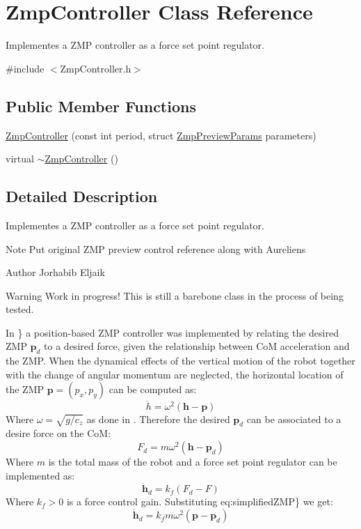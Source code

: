 \hypertarget{classZmpController}{}\section{Zmp\+Controller Class Reference}
\label{classZmpController}


Implementes a Z\+MP controller as a force set point regulator.  




{\ttfamily \#include $<$Zmp\+Controller.\+h$>$}

\subsection*{Public Member Functions}
\begin{DoxyCompactItemize}
\item 
\hyperlink{classZmpController_a99bbb6b02a6abafa3968d5c7a77e462b}{Zmp\+Controller} (const int period, struct \hyperlink{structZmpPreviewParams}{Zmp\+Preview\+Params} parameters)
\item 
virtual \hyperlink{classZmpController_af308a70e70cfe9a1e9569606da8b1739}{$\sim$\+Zmp\+Controller} ()
\end{DoxyCompactItemize}


\subsection{Detailed Description}
Implementes a Z\+MP controller as a force set point regulator. 

\begin{DoxyNote}{Note}
Put original Z\+MP preview control reference along with Aurelien\textquotesingle{}s
\end{DoxyNote}
\begin{DoxyAuthor}{Author}
Jorhabib Eljaik
\end{DoxyAuthor}
\cite{krause2012stabilization}

\begin{DoxyWarning}{Warning}
Work in progress! This is still a barebone class in the process of being tested.
\end{DoxyWarning}
In \cite{krause2012stabilization}\} a position-\/based Z\+MP controller was implemented by relating the desired Z\+MP $ \mathbf{p}_d $ to a desired force, given the relationship between CoM acceleration and the Z\+MP. When the dynamical effects of the vertical motion of the robot together with the change of angular momentum are neglected, the horizontal location of the Z\+MP $\mathbf{p} = (p_x, p_y)$ can be computed as\+: \begin{equation} \ddot{h} = \omega^2(\mathbf{h} - \mathbf{p}) \label{eq:simplifiedZMP} \end{equation} Where $\omega = \sqrt{g/c_z}$ as done in \cite{kajita2003biped}. Therefore the desired $\mathbf{p}_d$ can be associated to a desire force on the CoM\+: \[ F_d = m \omega^2 (\mathbf{h} - \mathbf{p}_d) \] Where $m$ is the total mass of the robot and a force set point regulator can be implemented as\+: \[ \dot{\mathbf{h}}_d = k_f(F_d - F) \] Where $k_f > 0$ is a force control gain. Substituting eq\+:simplified\+Z\+MP\} we get\+: \[ \dot{\mathbf{h}}_d = k_f m \omega^2(\mathbf{p} - \mathbf{p}_d) \] 

